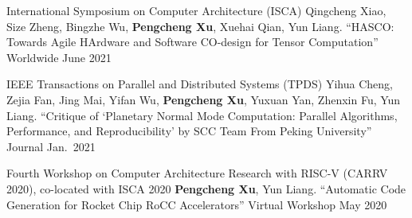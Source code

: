 \begin{cventries}
  \cventry
    {International Symposium on Computer Architecture (ISCA)}
    {{\normalfont Qingcheng Xiao, Size Zheng, Bingzhe Wu, \textbf{Pengcheng Xu}, Xuehai Qian, Yun Liang. ``HASCO: Towards Agile HArdware and Software CO-design for Tensor Computation''}}
    {Worldwide} %
    {June 2021} %
    {}

  \cventry
    {IEEE Transactions on Parallel and Distributed Systems (TPDS)}
    {{\normalfont Yihua Cheng, Zejia Fan, Jing Mai, Yifan Wu, \textbf{Pengcheng Xu}, Yuxuan Yan, Zhenxin Fu, Yun Liang. ``Critique of `Planetary Normal Mode Computation: Parallel Algorithms, Performance, and Reproducibility' by SCC Team From Peking University''}}
    {Journal} %
    {Jan.\ 2021} %
    {}

  \cventry
    {Fourth Workshop on Computer Architecture Research with RISC-V (CARRV 2020), co-located with ISCA 2020} %
    {{\normalfont \textbf{Pengcheng Xu}, Yun Liang. ``Automatic Code Generation for Rocket Chip RoCC Accelerators''}} %
    {Virtual Workshop} %
    {May 2020} %
    {}
\end{cventries}
